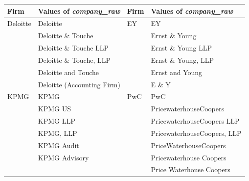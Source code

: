
\begin{tabular}{@{}ll@{\hspace{2cm}}ll@{}}
\toprule
Firm & Values of \textit{company\_raw} & Firm & Values of \textit{company\_raw} \\
\midrule
Deloitte & Deloitte & EY & EY \\
 & Deloitte \& Touche &  & Ernst \& Young \\
 & Deloitte \& Touche LLP &  & Ernst \& Young LLP \\
 & Deloitte \& Touche, LLP &  & Ernst \& Young, LLP \\
 & Deloitte and Touche &  & Ernst and Young \\
 & Deloitte (Accounting Firm) &  & E \& Y \\
\addlinespace[1em]
KPMG & KPMG & PwC & PwC \\
 & KPMG US &  & PricewaterhouseCoopers \\
 & KPMG LLP &  & PricewaterhouseCoopers LLP \\
 & KPMG, LLP &  & PricewaterhouseCoopers, LLP \\
 & KPMG Audit &  & PriceWaterhouseCoopers \\
 & KPMG Advisory &  & Pricewaterhouse Coopers \\
 &  &  & Price Waterhouse Coopers \\
\bottomrule
\end{tabular}

